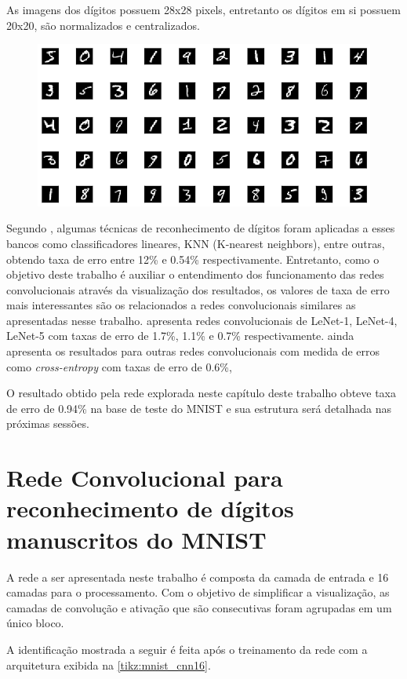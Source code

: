 \documentclass[
	12pt,				%
	oneside,			%
	a4paper,			%
	english,			%
	french,				%
	spanish,			%
	brazil,				%
	]{abntex2}
\begin{document}
\par As imagens dos dígitos possuem 28x28 pixels, entretanto os dígitos em si possuem 20x20, são normalizados e centralizados.

\begin{figure}
	\centering
	\includegraphics[width=0.7\linewidth]{images/fabio/inputs}
	\caption[Exemplos dos 50 primeiros digítos disponíveis na base de dados do MNIST.]{}
	\caption{}
	\label{fig:inputs}
\end{figure}

\par Segundo , algumas técnicas de reconhecimento de dígitos foram aplicadas a esses bancos como classificadores lineares, KNN (K-nearest neighbors), entre outras, obtendo taxa de erro entre 12\% e 0.54\% respectivamente. Entretanto, como o objetivo deste trabalho é auxiliar o entendimento dos funcionamento das redes convolucionais através da visualização dos resultados, os valores de taxa de erro mais interessantes são os relacionados a redes convolucionais similares as apresentadas nesse trabalho.  apresenta redes convolucionais de LeNet-1, LeNet-4, LeNet-5 com taxas de erro de 1.7\%, 1.1\% e 0.7\% respectivamente.  ainda apresenta os resultados para outras redes convolucionais com medida de erros como \textit{cross-entropy} com taxas de erro de 0.6\%,

\par O resultado obtido pela rede explorada neste capítulo deste trabalho obteve taxa de erro de 0.94\% na base de teste do MNIST e sua estrutura será detalhada nas próximas sessões.

\section{Rede Convolucional para reconhecimento de dígitos manuscritos do MNIST}
\par A rede a ser apresentada neste trabalho é composta da camada de entrada e 16 camadas para o processamento. Com o objetivo de simplificar a visualização, as camadas de convolução e ativação que são consecutivas foram agrupadas em um único bloco.
\par A identificação mostrada a seguir é feita após o treinamento da rede com a arquitetura exibida na \autoref{tikz:mnist_cnn16}.
\end{document}
